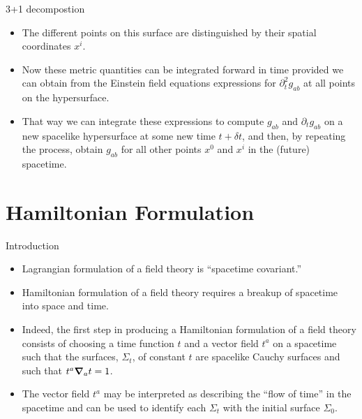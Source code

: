 \documentclass[10pt]{sintefbeamer}
\begin{document}
\begin{frame}{3+1 decompostion}
	\begin{itemize}
		\item The different points on this surface are distinguished by their spatial coordinates $x^i$.
		\item Now these metric quantities can be integrated forward in time provided we can obtain from the Einstein field equations expressions for $\partial^2_tg_{ab}$ at all points on the hypersurface.
		\item That way we can integrate these expressions to compute $g_{ab}$ and $\partial_t g_{ab}$ on a new spacelike hypersurface at some new time $t+\delta t$, and then, by repeating the process, obtain $g_{ab}$ for all other points $x^0$ and $x^i$ in the (future) spacetime.
	\end{itemize}
\end{frame}


\section{Hamiltonian Formulation}

\begin{frame}{Introduction}
	\begin{itemize}
		\item Lagrangian formulation of a field theory is ``spacetime covariant.''
		\item Hamiltonian formulation of a field theory requires a breakup of spacetime into space and time.
		\item Indeed, the first step in producing a Hamiltonian formulation of a field theory consists of choosing a time function $t$ and a vector field $t^a$ on a spacetime such that the surfaces, $\Sigma_t$, of constant $t$ are spacelike Cauchy surfaces and such that $t^a\grad_at=1$.
		\item The vector field $t^a$ may be interpreted as describing the ``flow of time'' in the spacetime and can be used to identify each $\Sigma_t$ with the initial surface $\Sigma_0$.
	\end{itemize}
\end{frame}
\end{document}
